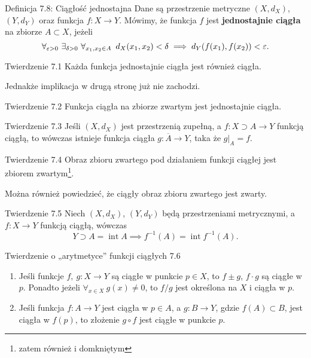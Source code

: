 \documentclass{article}
\newcommand{\hquad}{\mkern9mu}
\newcommand*\closure[1]{\overline{#1}}
\DeclareMathOperator{\interior}{int}
\begin{document}
\begin{defr}{Definicja 7.8: Ciągłość jednostajna}
    Dane są przestrzenie metryczne $(X, d_X)$, $(Y, d_Y)$ oraz funkcja $f:X\to Y$. Mówimy, że funkcja $f$ jest \textbf{jednostajnie
    ciągła} na zbiorze $A\subset X$, jeżeli
    \begin{equation*}
        \forall_{\varepsilon>0}\ \exists_{\delta>0}\ \forall_{x_1, x_2\in A}\hquad d_X(x_1, x_2)<\delta\implies d_Y(f(x_1), f(x_2))<\varepsilon.
    \end{equation*}
\end{defr}

\begin{twier}{Twierdzenie 7.1}
    Każda funkcja jednostajnie ciągła jest również ciągła.
\end{twier}

Jednakże implikacja w drugą stronę już nie zachodzi.

\begin{twier}{Twierdzenie 7.2}
    Funkcja ciągła na zbiorze zwartym jest jednostajnie ciągła.
\end{twier}

\begin{twier}{Twierdzenie 7.3}
    Jeśli $(X, d_X)$ jest przestrzenią zupełną, a $f:X\supset A\to Y$ funkcją ciągłą, to wówczas istnieje funkcja ciągła
    $g: \closure{A}\to Y$, taka że $g|_A=f$.
\end{twier}

\begin{twier}{Twierdzenie 7.4}
    Obraz zbioru zwartego pod działaniem funkcji ciągłej jest zbiorem zwartym\footnote{zatem również i domkniętym}.
\end{twier}

Można również powiedzieć, że ciągły obraz zbioru zwartego jest zwarty.

\begin{twier}{Twierdzenie 7.5}
    Niech $(X, d_X)$, $(Y, d_Y)$ będą przestrzeniami metrycznymi, a $f:X\to Y$ funkcją ciągłą, wówczas
    \begin{equation*}
        Y\supset A=\interior{A}\implies f^{-1}(A) = \interior{f^{-1}(A)}.
    \end{equation*}
\end{twier}

\begin{twier}{Twierdzenie o „arytmetyce” funkcji ciągłych 7.6}
\begin{enumerate}[label=(\arabic*)]
\item 
    Jeśli funkcje $f,\ g: X\to Y$ są ciągłe w punkcie $p\in X$, to $f\pm g$, $f\cdot g$ są ciągłe w $p$. Ponadto jeżeli
    $\forall_{x\in X}\ g(x)\neq0$, to $f/g$ jest określona na $X$ i ciągła w $p$.
\item  
    Jeśli funkcja $f:A\to Y$ jest ciągła w $p\in A$, a $g: B\to Y$, gdzie $f(A)\subset B$, jest ciągła w $f(p)$, to złożenie
    $g\circ f$ jest ciągłe w punkcie $p$.
\end{enumerate}
\end{twier}
\end{document}
